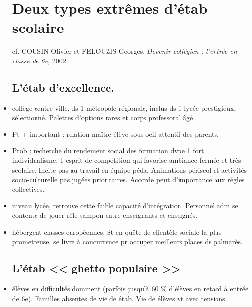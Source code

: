 \documentclass[12pt]{report}
\begin{document}
\begin{itemize}
{\begin{minipage}{19cm}
\begin{enumerate}
\end{enumerate}

\end{minipage}
}

\section{Deux types extrêmes d'étab scolaire}

cf. COUSIN Olivier et FELOUZIS Georges, \textit{Devenir collégien : l'entrée en classe de 6e}, 2002

\subsection{L'étab d'excellence.}

\item collège centre-ville, ds 1 métropole régionale, inclus ds 1 lycée prestigieux, sélectionné. Palettes d'options rares et corps professoral âgé. \\

\item Pt + important : relation maître-élève sous oeil attentif des parents. \\

\item Prob : recherche du rendement social des formation dvpe 1 fort individualisme, 1 esprit de compétition qui favorise ambiance fermée et très scolaire. Incite pas au travail en équipe péda. Animations périscol et activités socio-culturelle pas jugées prioritaires. Accorde peut d'importance aux règles collectives. \\

\item niveau lycée, retrouve cette faible capacité d'intégration. Personnel adm se contente de jouer rôle tampon entre enseignants et enseignés.

\item hébergent classes européennes. St en quête de clientèle sociale la plus prometteuse. se livre à concurrence pr occuper meilleurs places ds palmarès.


\subsection{L'étab << ghetto populaire >>}

\item élèves en difficultés dominent (parfois jusqu'à 60 \% d'élèves en retard à entrée de 6e). Familles absentes de vie de étab. Vie de élèves vt avec tensions. \\


\end{itemize}
\end{document}
